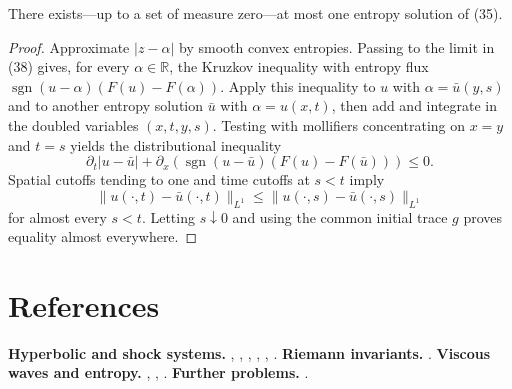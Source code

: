 \begin{theorem}
\label{thm:uniqueness-entropy-solutions-scalar-new}

There exists---up to a set of measure zero---at most one entropy solution of (35).
\end{theorem}

\begin{proof}
\sketch Approximate $|z-\alpha|$ by smooth convex entropies. Passing to the limit in (38) gives, for every $\alpha\in\mathbb R$, the Kruzkov inequality with entropy flux
$\operatorname{sgn}(u-\alpha)(F(u)-F(\alpha))$. Apply this inequality to $u$ with $\alpha=\bar u(y,s)$ and to another entropy solution $\bar u$ with $\alpha=u(x,t)$, then add and integrate in the doubled variables $(x,t,y,s)$. Testing with mollifiers concentrating on $x=y$ and $t=s$ yields the distributional inequality
\[
\partial_t|u-\bar u|
+\partial_x\!\left(\operatorname{sgn}(u-\bar u)(F(u)-F(\bar u))\right)\leq0.
\]
Spatial cutoffs tending to one and time cutoffs at $s<t$ imply
\[
\|u(\cdot,t)-\bar u(\cdot,t)\|_{L^1}
\leq\|u(\cdot,s)-\bar u(\cdot,s)\|_{L^1}
\]
for almost every $s<t$. Letting $s\downarrow0$ and using the common initial trace $g$ proves equality almost everywhere.
\end{proof}

\section{References}\label{sec:chapter11-references}
\textbf{Hyperbolic and shock systems.} \cite{Zheng2001}, \cite{Conlon1980}, \cite{LeVeque1992}, \cite{CourantFriedrichs1976}, \cite{XiaoZhang1989}, \cite{Zheng2001}.
\textbf{Riemann invariants.} \cite{Logan1987}.
\textbf{Viscous waves and entropy.} \cite{MajdaPego1985}, \cite{Conlon1980}, \cite{Smoller1983}.
\textbf{Further problems.} \cite{Kato1980}.
